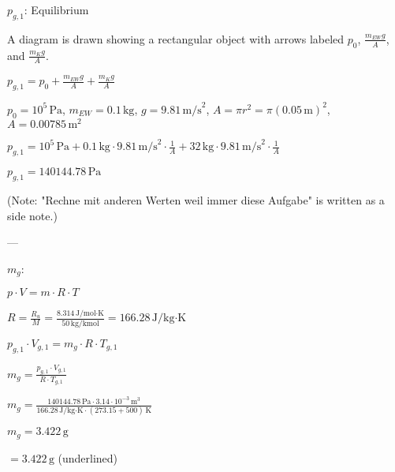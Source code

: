 \( p_{g,1} \): Equilibrium  

A diagram is drawn showing a rectangular object with arrows labeled \( p_0 \), \( \frac{m_{EW} g}{A} \), and \( \frac{m_K g}{A} \).  

\( p_{g,1} = p_0 + \frac{m_{EW} g}{A} + \frac{m_K g}{A} \)  

\( p_0 = 10^5 \, \text{Pa} \), \( m_{EW} = 0.1 \, \text{kg} \), \( g = 9.81 \, \text{m/s}^2 \), \( A = \pi r^2 = \pi (0.05 \, \text{m})^2 \), \( A = 0.00785 \, \text{m}^2 \)  

\( p_{g,1} = 10^5 \, \text{Pa} + 0.1 \, \text{kg} \cdot 9.81 \, \text{m/s}^2 \cdot \frac{1}{A} + 32 \, \text{kg} \cdot 9.81 \, \text{m/s}^2 \cdot \frac{1}{A} \)  

\( p_{g,1} = 140144.78 \, \text{Pa} \)  

(Note: "Rechne mit anderen Werten weil immer diese Aufgabe" is written as a side note.)  

---

\( m_g \):  

\( p \cdot V = m \cdot R \cdot T \)  

\( R = \frac{R_u}{M} = \frac{8.314 \, \text{J/mol·K}}{50 \, \text{kg/kmol}} = 166.28 \, \text{J/kg·K} \)  

\( p_{g,1} \cdot V_{g,1} = m_g \cdot R \cdot T_{g,1} \)  

\( m_g = \frac{p_{g,1} \cdot V_{g,1}}{R \cdot T_{g,1}} \)  

\( m_g = \frac{140144.78 \, \text{Pa} \cdot 3.14 \cdot 10^{-3} \, \text{m}^3}{166.28 \, \text{J/kg·K} \cdot (273.15 + 500) \, \text{K}} \)  

\( m_g = 3.422 \, \text{g} \)  

\( = 3.422 \, \text{g} \) (underlined)